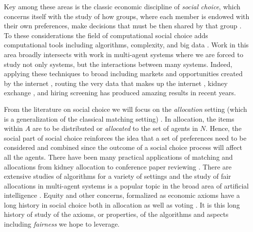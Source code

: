 Key among these areas is the classic economic discipline of \emph{social choice}, which concerns itself with the study of how groups, where each member is endowed with their own preferences, make decisions that must be then shared by that group \cite{Sen:CollectiveChoice}. To these considerations the field of computational social choice adds computational tools including algorithms, complexity, and big data \cite{BCELP16a}.  Work in this area broadly intersects with work in multi-agent systems \cite{Shoham:MultiagentSystems} where we are forced to study not only systems, but the interactions between many systems. Indeed, applying these techniques to broad including markets and opportunities created by the internet \cite{Moulin:FairInternet}, routing the very data that makes up the internet \cite{Kleinberg:Routing}, kidney exchange \cite{Dickerson:FairKidney}, and hiring screening \cite{Schumann:GroupFair} has produced amazing results in recent years. %

From the literature on social choice we will focus on the \emph{allocation} setting (which is a generalization of the classical matching setting) \cite{BCELP16a}. In allocation, the items within $A$ are to be distributed or \emph{allocated} to the set of agents in $N$.  Hence, the social part of social choice reinforces the idea that a set of preferences need to be considered and combined since the outcome of a social choice process will affect all the agents.  There have been many practical applications of matching and allocations from kidney allocation \cite{Roth:Kidney} to conference paper reviewing \cite{LiMaNoWa18}.  There are extensive studies of algorithms for a variety of settings \cite{Manlove:MatchingPrefs} and the study of fair allocations in multi-agent systems is a popular topic in the broad area of artificial intelligence \cite{Aziz:FairAllocation}. Equity and other concerns, formalized as economic axioms have a long history in social choice both in allocation \cite{Young:Equity} as well as voting \cite{Zwicker:Voting}. It is this long history of study of the axioms, or properties, of the algorithms and aspects including \emph{fairness} we hope to leverage.


